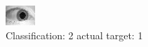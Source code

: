 \begin{figure}[h!]
\begin{center}
\includegraphics[width=0.60\columnwidth]{figures/ID1546_class_2_target_1.png}
\end{center}
\caption{ Classification: 2 actual target: 1}
\label{fig:ID1546_class_2_target_1}
\end{figure}
